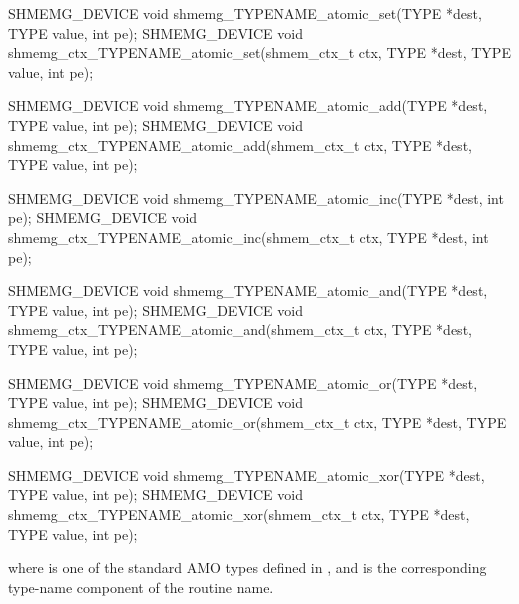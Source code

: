 \begin{apidefinition}
\begin{Csynopsis}
SHMEMG_DEVICE void shmemg_TYPENAME_atomic_set(TYPE *dest, TYPE value, int pe);
SHMEMG_DEVICE void shmemg_ctx_TYPENAME_atomic_set(shmem_ctx_t ctx,
    TYPE *dest, TYPE value, int pe);

SHMEMG_DEVICE void shmemg_TYPENAME_atomic_add(TYPE *dest, TYPE value, int pe);
SHMEMG_DEVICE void shmemg_ctx_TYPENAME_atomic_add(shmem_ctx_t ctx,
    TYPE *dest, TYPE value, int pe);

SHMEMG_DEVICE void shmemg_TYPENAME_atomic_inc(TYPE *dest, int pe);
SHMEMG_DEVICE void shmemg_ctx_TYPENAME_atomic_inc(shmem_ctx_t ctx,
    TYPE *dest, int pe);

SHMEMG_DEVICE void shmemg_TYPENAME_atomic_and(TYPE *dest, TYPE value, int pe);
SHMEMG_DEVICE void shmemg_ctx_TYPENAME_atomic_and(shmem_ctx_t ctx,
    TYPE *dest, TYPE value, int pe);

SHMEMG_DEVICE void shmemg_TYPENAME_atomic_or(TYPE *dest, TYPE value, int pe);
SHMEMG_DEVICE void shmemg_ctx_TYPENAME_atomic_or(shmem_ctx_t ctx,
    TYPE *dest, TYPE value, int pe);

SHMEMG_DEVICE void shmemg_TYPENAME_atomic_xor(TYPE *dest, TYPE value, int pe);
SHMEMG_DEVICE void shmemg_ctx_TYPENAME_atomic_xor(shmem_ctx_t ctx,
    TYPE *dest, TYPE value, int pe);
\end{Csynopsis}

where \TYPE{} is one of the standard AMO types defined in , and
\TYPENAME{} is the corresponding type-name component of the routine name.

\begin{apiarguments}
\end{apiarguments}

\end{apidefinition}
